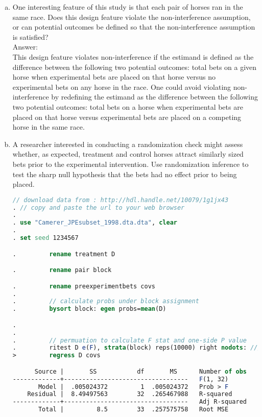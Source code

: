 \documentclass[11pt,notitlepage]{article}\usepackage[]{graphicx}\usepackage[]{color}
\begin{document}
\begin{enumerate}[a)]
\item One interesting feature of this study is that each pair of horses ran in the same race.  Does this design feature violate the non-interference assumption, or can potential outcomes be defined so that the non-interference assumption is satisfied? \\
Answer:\\
This design feature violates non-interference if the estimand is defined as the difference between the following two potential outcomes: total bets on a given horse when experimental bets are placed on that horse versus no experimental bets on any horse in the race.  One could avoid violating non-interference by redefining the estimand as the difference between the following two potential outcomes: total bets on a horse when experimental bets are placed on that horse versus experimental bets are placed on a competing horse in the same race. 

\item A researcher interested in conducting a randomization check might assess whether, as expected, treatment and control horses attract similarly sized bets prior to the experimental intervention.  Use randomization inference to test the sharp null hypothesis that the bets had no effect prior to being placed. \\

\begin{lstlisting}[language=stata]
 // download data from : http://hdl.handle.net/10079/1g1jx43
. // copy and paste the url to your web browser
. 
. use "Camerer_JPEsubset_1998.dta.dta", clear 
. 
. set seed 1234567

.         rename treatment D

.         rename pair block

.         rename preexperimentbets covs
. 
.         // calculate probs under block assignment
.         bysort block: egen probs=mean(D)

.         
.                 
.         // permuation to calculate F stat and one-side P value
.         ritest D e(F), strata(block) reps(10000) right nodots: ///
>         regress D covs

      Source |       SS           df       MS      Number of obs   =        34
-------------+----------------------------------   F(1, 32)        =      0.02
       Model |  .005024372         1  .005024372   Prob > F        =    0.8914
    Residual |  8.49497563        32  .265467988   R-squared       =    0.0006
-------------+----------------------------------   Adj R-squared   =   -0.0306
       Total |         8.5        33  .257575758   Root MSE        =    .51524


\end{lstlisting}
\end{enumerate}
\end{document}
